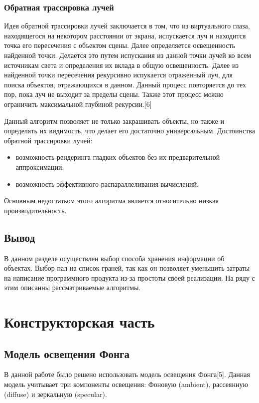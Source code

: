 \documentclass[12pt]{report}
\begin{document}
	\subsection{Обратная трассировка лучей}
	Идея обратной трассировки лучей заключается в том, что из виртуального глаза, находящегося на некотором расстоянии от экрана, испускается луч и находится точка его пересечения с объектом сцены. Далее определяется освещенность найденной точки. Делается это путем испускания из данной точки лучей ко всем источникам света и определения их вклада в общую освещенность. Далее из найденной точки пересечения рекурсивно испукается отраженный луч, для поиска объектов, отражающихся в данном. Данный процесс повторяется до тех пор, пока луч не выходит за пределы сцены. Также этот процесс можно ограничить максимальной глубиной рекурсии.[6]
	
	Данный алгоритм позволяет не только закрашивать объекты, но также и определять их видимость, что делает его достаточно универсальным.
	Достоинства обратной трассировки лучей:
	\begin{itemize}
		\item возможность рендеринга гладких объектов без их предварительной аппроксимации;
		\item возможность эффективного распараллеливания вычислений.
	\end{itemize}

	Основным недостатком этого алгоритма является относительно низкая производительность.
	
	\section*{Вывод}
	
	В данном разделе осуществлен выбор способа хранения информации об объектах. Выбор пал на список граней, так как он позволяет уменьшить затраты на написание программного продукта из-за простоты своей реализации. На ряду с этим описанны рассматриваемые алгоритмы.
	
	\chapter{Конструкторская часть}
	\section{Модель освещения Фонга}
	
	В данной работе было решено использовать модель освещения Фонга[5]. Данная модель учитывает три компоненты освещения: Фоновую (ambient), рассеянную (diffuse) и зеркальную (specular).
		
\end{document}
